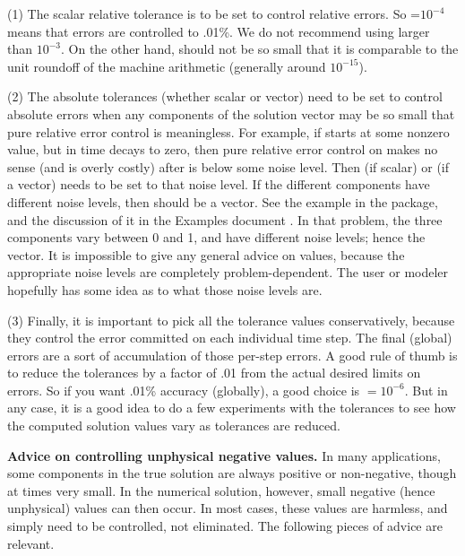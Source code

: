 (1) The scalar relative tolerance  is to be set to control relative
errors.  So =$10^{-4}$ means that errors are controlled to .01\%.  We
do not recommend using  larger than $10^{-3}$.  On the other hand,
 should not be so small that it is comparable to the unit roundoff
of the machine arithmetic (generally around $10^{-15}$).

(2) The absolute tolerances  (whether scalar or vector) need to
be set to control absolute errors when any components of the solution
vector  may be so small that pure relative error control is
meaningless.  For example, if  starts at some nonzero value, but in time
decays to zero, then pure relative error control on  makes no sense
(and is overly costly) after  is below some noise level.  Then
 (if scalar) or  (if a vector) needs to be set to that
noise level.  If the different components have different noise levels,
then  should be a vector.  See the example  in the
{\idas} package, and the discussion of it in the {\idas} Examples document
\cite{idas_ex}.
In that problem, the three components vary between 0 and 1, and have
different noise levels; hence the  vector.  It is impossible to
give any general advice on  values, because the appropriate noise
levels are completely problem-dependent.  The user or modeler hopefully has
some idea as to what those noise levels are.

(3) Finally, it is important to pick all the tolerance values conservatively,
because they control the error committed on each individual time step.
The final (global) errors are a sort of accumulation of those
per-step errors.  A good rule of thumb is to reduce the tolerances by a
factor of .01 from the actual desired limits on errors.  So if you
want .01\% accuracy (globally), a good choice is $=10^{-6}$.
But in any case, it is a good idea to do a few experiments with
the tolerances to see how the computed solution values vary as
tolerances are reduced.

\vspace{0.1in}
{\bf Advice on controlling unphysical negative values.}
In many applications, some components in the true solution are always
positive or non-negative, though at times very small.  In the numerical
solution, however, small negative (hence unphysical) values can then
occur.  In most cases, these values are harmless, and simply need to
be controlled, not eliminated. The following pieces of advice are relevant.

